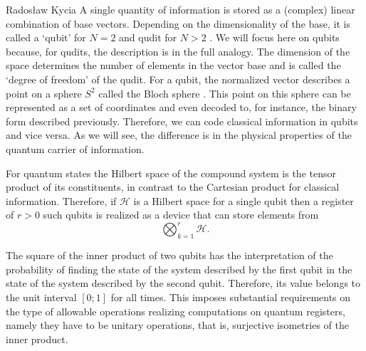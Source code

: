 \begin{artengenv}{Radosław Kycia}
A single quantity of information is stored as a (complex) linear combination of base vectors. Depending on the dimensionality of the base, it is called a `qubit' for $N=2$ and qudit for $N>2$ \parencite[see e.g.][]{QuantumComputing}. We will focus here on qubits because, for qudits, the description is in the full analogy. The dimension of the space determines the number of elements in the vector base and is called the `degree of freedom' of the qudit. For a qubit, the normalized vector describes a point on a sphere $S^{2}$ called the Bloch sphere \parencite{QuantumComputing}. This point on this sphere can be represented as a set of coordinates and even decoded to, for instance, the binary form described previously. Therefore, we can code classical information in qubits and vice versa. As we will see, the difference is in the physical properties of the quantum carrier of information. 

For quantum states the Hilbert space of the compound system is the tensor product of its constituents, in contrast to the Cartesian product for classical information. Therefore, if $\mathcal{H}$ is a Hilbert space for a single qubit then a register of $r>0$ such qubits is realized as a device that can store elements from
\begin{equation}
 \bigotimes_{k=1}^{r} \mathcal{H}.
\end{equation}

The square of the inner product of two qubits has the interpretation of the probability of finding the state of the system described by the first qubit in the state of the system described by the second qubit. Therefore, its value belongs to the unit interval $[0; 1]$ for all times. This imposes substantial requirements on the type of allowable operations realizing computations on quantum registers, namely they have to be unitary operations, that is, surjective isometries of the inner product.


\end{artengenv}
